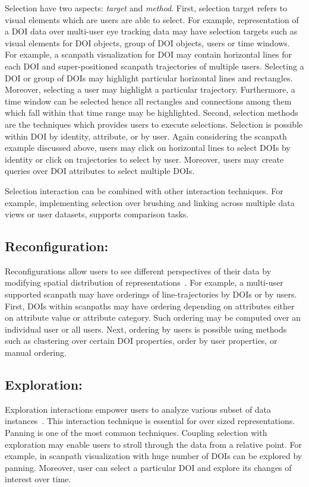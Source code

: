 Selection have two aspects: \textit{target} and \textit{method}. First, selection target refers to visual elements which are users are able to select. For example, representation of a DOI data over multi-user eye tracking data may have selection targets such as visual elements for DOI objects, group of DOI objects, users or time windows. For example, a scanpath visualization for DOI may contain horizontal lines for each DOI and super-positioned scanpath trajectories of multiple users. Selecting a DOI or group of DOIs may highlight particular horizontal lines and rectangles. Moreover, selecting a user may highlight a particular trajectory. Furthermore, a time window can be selected hence all rectangles and connections among them which fall within that time range may be highlighted. Second, selection methods are the techniques which provides users to execute selections. Selection is possible within DOI by identity, attribute, or by user. Again considering the scanpath example discussed above, users may click on horizontal lines to select DOIs by identity or click on trajectories to select by user. Moreover, users may create queries over DOI attributes to select multiple DOIs. 

Selection interaction can be combined with other interaction techniques. For example, implementing selection over brushing and linking across multiple data views or user datasets, supports comparison tasks. 

	
	
\subsection{Reconfiguration:} Reconfigurations allow users to see different perspectives of their data by modifying spatial distribution of representations~\cite{yi2007toward}. For example, a multi-user supported scanpath may have orderings of line-trajectories by DOIs or by users. First, DOIs within scanpaths may have ordering depending on attributes either on attribute value or attribute category. Such ordering may be computed over an individual user or all users. Next, ordering by users is possible using methods such as clustering over certain DOI properties, order by user properties, or manual ordering.

\subsection{Exploration:} Exploration interactions empower users to analyze various subset of data instances~\cite{yi2007toward}. This interaction technique is essential for over sized representations. Panning is one of the most common techniques. Coupling selection with exploration may enable users to stroll through the data from a relative point. For example, in scanpath visualization with huge number of DOIs can be explored by panning. Moreover, user can select a particular DOI and explore its changes of interest over time. 
	
